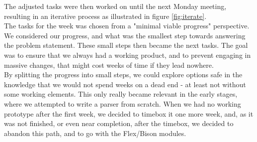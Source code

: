 The adjusted tasks were then worked on until the next Monday meeting, resulting in an iterative process as illustrated in figure \ref{fig:iterate}.\\

The tasks for the week was chosen from a "minimal viable progress" perspective. We
considered our progress, and what was the smallest step towards answering the problem
statement. These small steps then became the next tasks. The goal was to ensure that
we always had a working product, and to prevent engaging in massive changes, that
might cost weeks of time if they lead nowhere. \\

By splitting the progress into small steps, we could explore options safe in the
knowledge that we would not spend weeks on a dead end - at least not without some working elements. This only really became relevant in the early stages, where we attempted to write a parser from scratch. When we had no working prototype after the first week, we decided to timebox it one more week, and, as it was not finished, or even near completion, after the timebox, we decided to abandon this path, and to go with the Flex/Bison modules.

